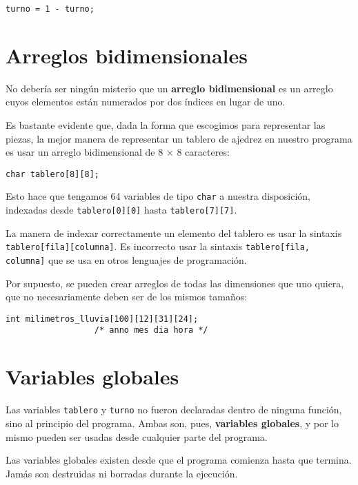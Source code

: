 \begin{lstlisting}
turno = 1 - turno;
\end{lstlisting}

\section{Arreglos bidimensionales}

No debería ser ningún misterio que un \textbf{arreglo bidimensional} es
un arreglo cuyos elementos están numerados por dos índices en lugar de
uno.

Es bastante evidente que, dada la forma que escogimos para representar
las piezas, la mejor manera de representar un tablero de ajedrez en
nuestro programa es usar un arreglo bidimensional de 8 × 8 caracteres:

\begin{lstlisting}
char tablero[8][8];
\end{lstlisting}

Esto hace que tengamos 64 variables de tipo \lstinline!char! a nuestra
disposición, indexadas desde \lstinline!tablero[0][0]! hasta
\lstinline!tablero[7][7]!.

La manera de indexar correctamente un elemento del tablero es usar la
sintaxis \lstinline!tablero[fila][columna]!. Es incorrecto usar la
sintaxis \lstinline!tablero[fila, columna]! que se usa en otros
lenguajes de programación.

Por supuesto, se pueden crear arreglos de todas las dimensiones que uno
quiera, que no necesariamente deben ser de los mismos tamaños:

\begin{lstlisting}
int milimetros_lluvia[100][12][31][24];
                  /* anno mes dia hora */
\end{lstlisting}

\section{Variables globales}

Las variables \lstinline!tablero! y \lstinline!turno! no fueron
declaradas dentro de ninguna función, sino al principio del programa.
Ambas son, pues, \textbf{variables globales}, y por lo mismo pueden ser
usadas desde cualquier parte del programa.

Las variables globales existen desde que el programa comienza hasta que
termina. Jamás son destruidas ni borradas durante la ejecución.


